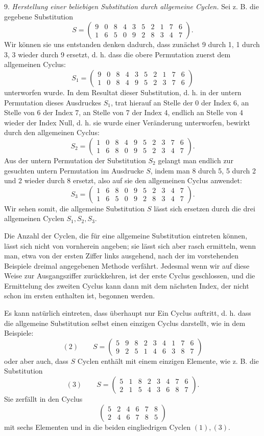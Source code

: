 \documentclass[10pt]{article}
\begin{document}
9. \emph{Herstellung einer beliebigen Substitution durch allgemeine Cyclen.} Sei z. B. die gegebene Substitution
\[
S=\begin{pmatrix}9&0&8&4&3&5&2&1&7&6\\1&6&5&0&9&2&8&3&4&7\end{pmatrix}.
\]
Wir können sie uns entstanden denken dadurch, dass zunächst 9 durch 1, 1 durch 3, 3 wieder durch 9 ersetzt, d. h. dass die obere Permutation zuerst dem allgemeinen Cyclus:
\[
S_1=\begin{pmatrix}9&0&8&4&3&5&2&1&7&6\\1&0&8&4&9&5&2&3&7&6\end{pmatrix}
\]
unterworfen wurde. In dem Resultat dieser Substitution, d. h. in der untern Permutation dieses Ausdruckes \(S_1\), trat hierauf an Stelle der 0 der Index 6, an Stelle von 6 der Index 7, an Stelle von 7 der Index 4, endlich an Stelle von 4 wieder der Index Null, d. h. sie wurde einer Veränderung unterworfen, bewirkt durch den allgemeinen Cyclus:
\[
S_2=\begin{pmatrix}1&0&8&4&9&5&2&3&7&6\\1&6&8&0&9&5&2&3&4&7\end{pmatrix}.
\]
Aus der untern Permutation der Substitution \(S_2\) gelangt man endlich zur gesuchten untern Permutation im Ausdrucke \(S\), indem man 8 durch 5, 5 durch 2 und 2 wieder durch 8 ersetzt, also auf sie den allgemeinen Cyclus anwendet:
\[
S_3=\begin{pmatrix}1&6&8&0&9&5&2&3&4&7\\1&6&5&0&9&2&8&3&4&7\end{pmatrix}.
\]
Wir sehen somit, die allgemeine Substitution \(S\) lässt sich ersetzen durch die drei allgemeinen Cyclen \(S_1,S_2,S_3\).

Die Anzahl der Cyclen, die für eine allgemeine Substitution eintreten können, lässt sich nicht von vornherein angeben; sie lässt sich aber rasch ermitteln, wenn man, etwa von der ersten Ziffer links ausgehend, nach der im vorstehenden Beispiele dreimal angegebenen Methode verfährt. Jedesmal wenn wir auf diese Weise zur Ausgangsziffer zurückkehren, ist der erste Cyclus geschlossen, und die Ermittelung des zweiten Cyclus kann dann mit dem nächsten Index, der nicht schon im ersten enthalten ist, begonnen werden.

Es kann natürlich eintreten, dass überhaupt nur Ein Cyclus auftritt, d. h. dass die allgemeine Substitution selbst einen einzigen Cyclus darstellt, wie in dem Beispiele:
\[
(2)\qquad S=\begin{pmatrix}5&9&8&2&3&4&1&7&6\\9&2&5&1&4&6&3&8&7\end{pmatrix}
\]
oder aber auch, dass \(S\) Cyclen enthält mit einem einzigen Elemente, wie z. B. die Substitution
\[
(3)\qquad S=\begin{pmatrix}5&1&8&2&3&4&7&6\\2&1&5&4&3&6&8&7\end{pmatrix}.
\]
Sie zerfällt in den Cyclus
\[
\begin{pmatrix}5&2&4&6&7&8\\2&4&6&7&8&5\end{pmatrix}
\]
mit sechs Elementen und in die beiden eingliedrigen Cyclen \((1),(3)\).
\end{document}
